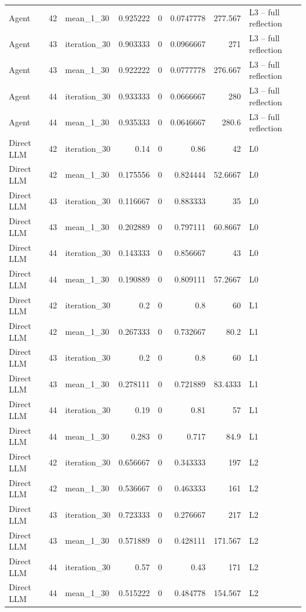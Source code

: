 \begin{table}[htbp!]
\begin{tabular}{lrlrrrrl}
Agent & 42 & mean\_1\_30 & 0.925222 & 0 & 0.0747778 & 277.567 & L3 -- full reflection \\
Agent & 43 & iteration\_30 & 0.903333 & 0 & 0.0966667 & 271 & L3 -- full reflection \\
Agent & 43 & mean\_1\_30 & 0.922222 & 0 & 0.0777778 & 276.667 & L3 -- full reflection \\
Agent & 44 & iteration\_30 & 0.933333 & 0 & 0.0666667 & 280 & L3 -- full reflection \\
Agent & 44 & mean\_1\_30 & 0.935333 & 0 & 0.0646667 & 280.6 & L3 -- full reflection \\
Direct LLM & 42 & iteration\_30 & 0.14 & 0 & 0.86 & 42 & L0 \\
Direct LLM & 42 & mean\_1\_30 & 0.175556 & 0 & 0.824444 & 52.6667 & L0 \\
Direct LLM & 43 & iteration\_30 & 0.116667 & 0 & 0.883333 & 35 & L0 \\
Direct LLM & 43 & mean\_1\_30 & 0.202889 & 0 & 0.797111 & 60.8667 & L0 \\
Direct LLM & 44 & iteration\_30 & 0.143333 & 0 & 0.856667 & 43 & L0 \\
Direct LLM & 44 & mean\_1\_30 & 0.190889 & 0 & 0.809111 & 57.2667 & L0 \\
Direct LLM & 42 & iteration\_30 & 0.2 & 0 & 0.8 & 60 & L1 \\
Direct LLM & 42 & mean\_1\_30 & 0.267333 & 0 & 0.732667 & 80.2 & L1 \\
Direct LLM & 43 & iteration\_30 & 0.2 & 0 & 0.8 & 60 & L1 \\
Direct LLM & 43 & mean\_1\_30 & 0.278111 & 0 & 0.721889 & 83.4333 & L1 \\
Direct LLM & 44 & iteration\_30 & 0.19 & 0 & 0.81 & 57 & L1 \\
Direct LLM & 44 & mean\_1\_30 & 0.283 & 0 & 0.717 & 84.9 & L1 \\
Direct LLM & 42 & iteration\_30 & 0.656667 & 0 & 0.343333 & 197 & L2 \\
Direct LLM & 42 & mean\_1\_30 & 0.536667 & 0 & 0.463333 & 161 & L2 \\
Direct LLM & 43 & iteration\_30 & 0.723333 & 0 & 0.276667 & 217 & L2 \\
Direct LLM & 43 & mean\_1\_30 & 0.571889 & 0 & 0.428111 & 171.567 & L2 \\
Direct LLM & 44 & iteration\_30 & 0.57 & 0 & 0.43 & 171 & L2 \\
Direct LLM & 44 & mean\_1\_30 & 0.515222 & 0 & 0.484778 & 154.567 & L2 \\

\end{tabular}
\end{table}
